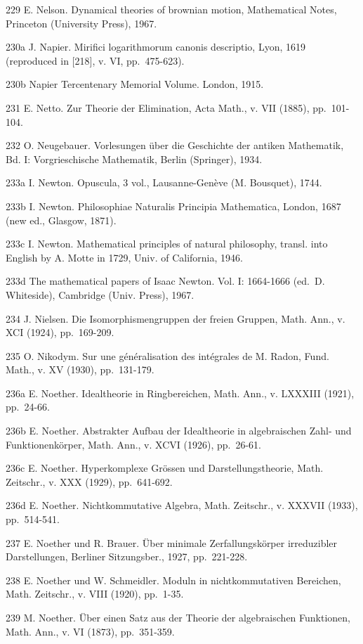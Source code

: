 229 E. Nelson. Dynamical theories of brownian motion, Mathematical Notes, Princeton (University Press), 1967.

230a J. Napier. Mirifici logarithmorum canonis descriptio, Lyon, 1619 (reproduced in {[}218{]}, v. VI, pp.~475-623).

230b Napier Tercentenary Memorial Volume. London, 1915.

231 E. Netto. Zur Theorie der Elimination, Acta Math., v. VII (1885), pp.~101-104.

232 O. Neugebauer. Vorlesungen über die Geschichte der antiken Mathematik, Bd. I: Vorgrieschische Mathematik, Berlin (Springer), 1934.

233a I. Newton. Opuscula, 3 vol., Lausanne-Genève (M. Bousquet), 1744.

233b I. Newton. Philosophiae Naturalis Principia Mathematica, London, 1687 (new ed., Glasgow, 1871).

233c I. Newton. Mathematical principles of natural philosophy, transl. into English by A. Motte in 1729, Univ. of California, 1946.

233d The mathematical papers of Isaac Newton. Vol. I: 1664-1666 (ed.~D. Whiteside), Cambridge (Univ. Press), 1967.

234 J. Nielsen. Die Isomorphismengruppen der freien Gruppen, Math. Ann., v. XCI (1924), pp.~169-209.

235 O. Nikodym. Sur une généralisation des intégrales de M. Radon, Fund. Math., v. XV (1930), pp.~131-179.

236a E. Noether. Idealtheorie in Ringbereichen, Math. Ann., v. LXXXIII (1921), pp.~24-66.

236b E. Noether. Abstrakter Aufbau der Idealtheorie in algebraischen Zahl- und Funktionenkörper, Math. Ann., v. XCVI (1926), pp.~26-61.

236c E. Noether. Hyperkomplexe Grössen und Darstellungstheorie, Math. Zeitschr., v. XXX (1929), pp.~641-692.

236d E. Noether. Nichtkommutative Algebra, Math. Zeitschr., v. XXXVII (1933), pp.~514-541.

237 E. Noether und R. Brauer. Über minimale Zerfallungskörper irreduzibler Darstellungen, Berliner Sitzungsber., 1927, pp.~221-228.

238 E. Noether und W. Schmeidler. Moduln in nichtkommutativen Bereichen, Math. Zeitschr., v. VIII (1920), pp.~1-35.

239 M. Noether. Über einen Satz aus der Theorie der algebraischen Funktionen, Math. Ann., v. VI (1873), pp.~351-359.

